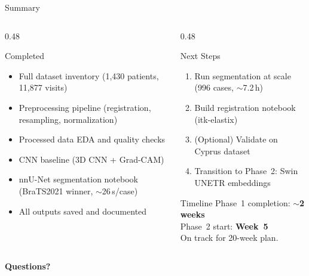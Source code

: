 \documentclass[aspectratio=169, dvipsnames]{beamer}
\begin{document}
\begin{frame}{Summary}
    \begin{columns}
        \begin{column}{0.48\textwidth}
            \begin{block}{ Completed}
                \small
                \begin{itemize}
                    \item Full dataset inventory (1,430 patients, 11,877 visits)
                    \item Preprocessing pipeline (registration, resampling, normalization)
                    \item Processed data EDA and quality checks
                    \item CNN baseline (3D CNN + Grad-CAM)
                    \item nnU-Net segmentation notebook (BraTS2021 winner, $\sim$26\,s/case)
                    \item All outputs saved and documented
                \end{itemize}
            \end{block}
        \end{column}

        \begin{column}{0.48\textwidth}
            \begin{alertblock}{ Next Steps}
                \small
                \begin{enumerate}
                    \item Run segmentation at scale (996 cases, $\sim$7.2\,h)
                    \item Build registration notebook (itk-elastix)
                    \item (Optional) Validate on Cyprus dataset
                    \item Transition to Phase~2: Swin UNETR embeddings
                \end{enumerate}
            \end{alertblock}

            \vspace{0.3em}

            \begin{exampleblock}{ Timeline}
                \small
                Phase~1 completion: \textbf{$\sim$2 weeks}\\
                Phase~2 start: \textbf{Week~5}\\
                On track for 20-week plan.
            \end{exampleblock}
        \end{column}
    \end{columns}

    \vspace{0.5em}

    \begin{center}
        \large \textbf{Questions?}
    \end{center}
\end{frame}
\end{document}
